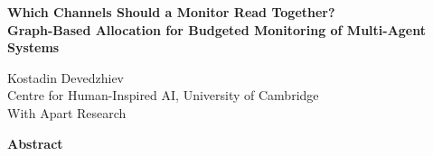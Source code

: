 \documentclass[11pt]{article}
\begin{document}
\begin{center}
{\Large\bfseries Which Channels Should a Monitor Read Together?\\[3pt]
Graph-Based Allocation for Budgeted Monitoring of Multi-Agent Systems\par}
\vspace{14pt}
Kostadin Devedzhiev\\
Centre for Human-Inspired AI, University of Cambridge\\[6pt]
With Apart Research\\[14pt]
{\bfseries Abstract\par}
\end{center}
\vspace{2pt}
\begin{list}{}{\textwidth{}\textwidth\topsep=0pt}\item[]\small

\end{list}
\vspace{4pt}






\clearpage
\appendix
{}

\end{document}
